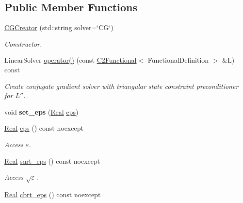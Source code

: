 \subsection*{\-Public \-Member \-Functions}
\begin{DoxyCompactItemize}
\item 
\hyperlink{classSpacy_1_1Kaskade_1_1Lagrange_1_1CGCreator_a238054bebf7f15f35b159a3e1804839d}{\-C\-G\-Creator} (std\-::string solver=\char`\"{}\-C\-G\char`\"{})
\begin{DoxyCompactList}\small\item\em \-Constructor. \end{DoxyCompactList}\item 
\-Linear\-Solver \hyperlink{classSpacy_1_1Kaskade_1_1Lagrange_1_1CGCreator_aa9c6be1ff4b871694dc24d026d7d352b}{operator()} (const \hyperlink{classSpacy_1_1Kaskade_1_1C2Functional}{\-C2\-Functional}$<$ \-Functional\-Definition $>$ \&\-L) const 
\begin{DoxyCompactList}\small\item\em \-Create conjugate gradient solver with triangular state constraint preconditioner for $L''$. \end{DoxyCompactList}\item 
\hypertarget{classSpacy_1_1Mixin_1_1Eps_a818ab6dfab5e4eea583e1302bcc621f8}{void {\bfseries set\-\_\-eps} (\hyperlink{classSpacy_1_1Real}{\-Real} \hyperlink{classSpacy_1_1Mixin_1_1Eps_a812b99b0abc1d78a34b4114907f23f52}{eps})}\label{classSpacy_1_1Mixin_1_1Eps_a818ab6dfab5e4eea583e1302bcc621f8}

\item 
\hypertarget{classSpacy_1_1Mixin_1_1Eps_a812b99b0abc1d78a34b4114907f23f52}{\hyperlink{classSpacy_1_1Real}{\-Real} \hyperlink{classSpacy_1_1Mixin_1_1Eps_a812b99b0abc1d78a34b4114907f23f52}{eps} () const noexcept}\label{classSpacy_1_1Mixin_1_1Eps_a812b99b0abc1d78a34b4114907f23f52}

\begin{DoxyCompactList}\small\item\em \-Access $\varepsilon$. \end{DoxyCompactList}\item 
\hypertarget{classSpacy_1_1Mixin_1_1Eps_a1c1b0ed7f14ed4967dc7da9295a136d4}{\hyperlink{classSpacy_1_1Real}{\-Real} \hyperlink{classSpacy_1_1Mixin_1_1Eps_a1c1b0ed7f14ed4967dc7da9295a136d4}{sqrt\-\_\-eps} () const noexcept}\label{classSpacy_1_1Mixin_1_1Eps_a1c1b0ed7f14ed4967dc7da9295a136d4}

\begin{DoxyCompactList}\small\item\em \-Access $\sqrt\varepsilon$. \end{DoxyCompactList}\item 
\hypertarget{classSpacy_1_1Mixin_1_1Eps_a91dbe45e297be2bc53f1a96107a58c64}{\hyperlink{classSpacy_1_1Real}{\-Real} \hyperlink{classSpacy_1_1Mixin_1_1Eps_a91dbe45e297be2bc53f1a96107a58c64}{cbrt\-\_\-eps} () const noexcept}\label{classSpacy_1_1Mixin_1_1Eps_a91dbe45e297be2bc53f1a96107a58c64}


\end{DoxyCompactItemize}
